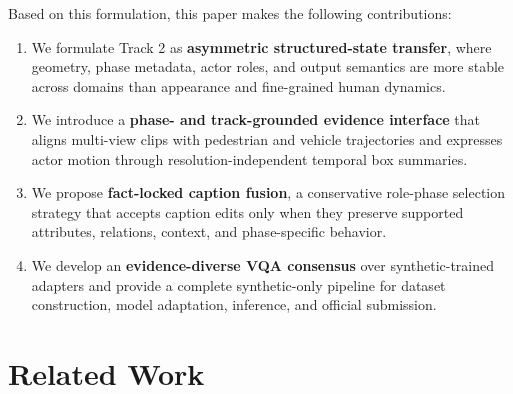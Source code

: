 \documentclass[runningheads]{llncs}
\begin{document}
Based on this formulation, this paper makes the following contributions:
\begin{enumerate}
    \item We formulate Track 2 as \textbf{asymmetric structured-state transfer}, where geometry, phase metadata, actor roles, and output semantics are more stable across domains than appearance and fine-grained human dynamics.
    \item We introduce a \textbf{phase- and track-grounded evidence interface} that aligns multi-view clips with pedestrian and vehicle trajectories and expresses actor motion through resolution-independent temporal box summaries.
    \item We propose \textbf{fact-locked caption fusion}, a conservative role-phase selection strategy that accepts caption edits only when they preserve supported attributes, relations, context, and phase-specific behavior.
    \item We develop an \textbf{evidence-diverse VQA consensus} over synthetic-trained adapters and provide a complete synthetic-only pipeline for dataset construction, model adaptation, inference, and official submission.
\end{enumerate}

\section{Related Work}
\end{document}
